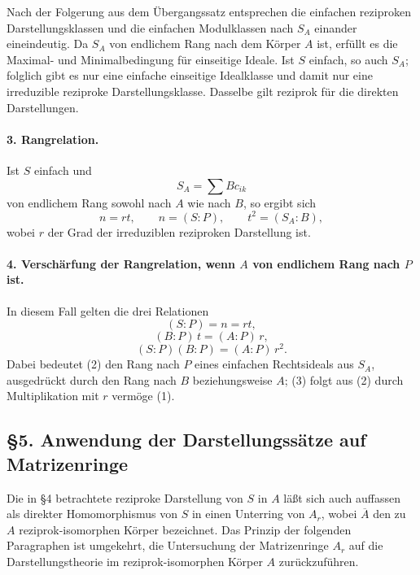 \documentclass[11pt]{article}
\begin{document}
Nach der Folgerung aus dem Übergangssatz entsprechen die einfachen reziproken Darstellungsklassen und die einfachen Modulklassen nach \(S_A\) einander eineindeutig. Da \(S_A\) von endlichem Rang nach dem Körper \(A\) ist, erfüllt es die Maximal- und Minimalbedingung für einseitige Ideale. Ist \(S\) einfach, so auch \(S_A\); folglich gibt es nur eine einfache einseitige Idealklasse und damit nur eine irreduzible reziproke Darstellungsklasse. Dasselbe gilt reziprok für die direkten Darstellungen.

\paragraph{3. Rangrelation.}
Ist \(S\) einfach und
\[
        S_A=\sum Bc_{ik}
\]
von endlichem Rang sowohl nach \(A\) wie nach \(B\), so ergibt sich
\[
        n=rt,\qquad n=(S:P),\qquad t^2=(S_A:B),                         \tag{1}
\]
wobei \(r\) der Grad der irreduziblen reziproken Darstellung ist.

\paragraph{4. Verschärfung der Rangrelation, wenn \(A\) von endlichem Rang nach \(P\) ist.}
In diesem Fall gelten die drei Relationen
\[
        (S:P)=n=rt,                                                     \tag{1}
\]
\[
        (B:P)\,t=(A:P)\,r,                                               \tag{2}
\]
\[
        (S:P)(B:P)=(A:P)\,r^2.                                           \tag{3}
\]
Dabei bedeutet (2) den Rang nach \(P\) eines einfachen Rechtsideals aus \(S_A\), ausgedrückt durch den Rang nach \(B\) beziehungsweise \(A\); (3) folgt aus (2) durch Multiplikation mit \(r\) vermöge (1).

\subsection*{§5. Anwendung der Darstellungssätze auf Matrizenringe}

Die in §4 betrachtete reziproke Darstellung von \(S\) in \(A\) läßt sich auch auffassen als direkter Homomorphismus von \(S\) in einen Unterring von \(A_r\), wobei \(\overline A\) den zu \(A\) reziprok-isomorphen Körper bezeichnet. Das Prinzip der folgenden Paragraphen ist umgekehrt, die Untersuchung der Matrizenringe \(A_r\) auf die Darstellungstheorie im reziprok-isomorphen Körper \(A\) zurückzuführen.
\end{document}
